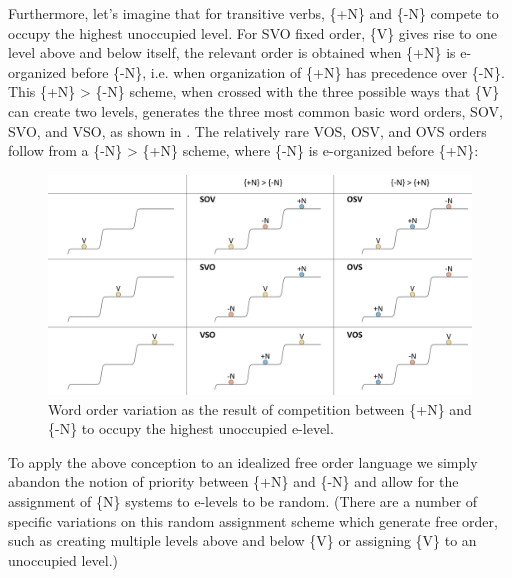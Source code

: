   Furthermore, let's imagine that for transitive verbs, \{+N\} and \{-N\} compete to occupy the highest unoccupied level. For SVO fixed order, \{V\} gives rise to one level above and below itself, the relevant order is obtained when \{+N\} is e-organized before \{-N\}, i.e. when organization of \{+N\} has precedence over \{-N\}. This \{+N\} > \{-N\} scheme, when crossed with the three possible ways that \{V\} can create two levels, generates the three most common basic word orders, SOV, SVO, and VSO, as shown in {}. The relatively rare VOS, OSV, and OVS orders follow from a \{-N\} > \{+N\} scheme, where \{-N\} is e-organized before \{+N\}:

  
\begin{figure}
\includegraphics[width=\textwidth]{figures/Tilsen-img75.png}
\caption{Word order variation as the result of competition between \{+N\} and \{-N\} to occupy the highest unoccupied e-level.}
\label{fig:4:25}
\end{figure}
 

  To apply the above conception to an idealized free order language we simply abandon the notion of priority between \{+N\} and \{-N\} and allow for the assignment of \{N\} systems to e-levels to be random. (There are a number of specific variations on this random assignment scheme which generate free order, such as creating multiple levels above and below \{V\} or assigning \{V\} to an unoccupied level.)

